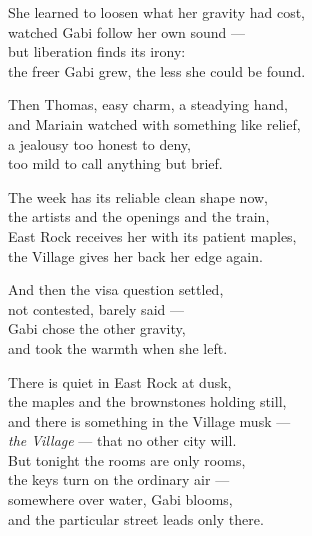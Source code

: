 \begin{lyrics}
She learned to loosen what her gravity had cost,\\
watched Gabi follow her own sound —\\
but liberation finds its irony:\\
the freer Gabi grew, the less she could be found.

Then Thomas, easy charm, a steadying hand,\\
and Mariain watched with something like relief,\\
a jealousy too honest to deny,\\
too mild to call anything but brief.

The week has its reliable clean shape now,\\
the artists and the openings and the train,\\
East Rock receives her with its patient maples,\\
the Village gives her back her edge again.

And then the visa question settled,\\
not contested, barely said —\\
Gabi chose the other gravity,\\
and took the warmth when she left.

There is quiet in East Rock at dusk,\\
the maples and the brownstones holding still,\\
and there is something in the Village musk —\\
\emph{the Village} — that no other city will.\\
But tonight the rooms are only rooms,\\
the keys turn on the ordinary air —\\
somewhere over water, Gabi blooms,\\
and the particular street leads only there.

\end{lyrics}

